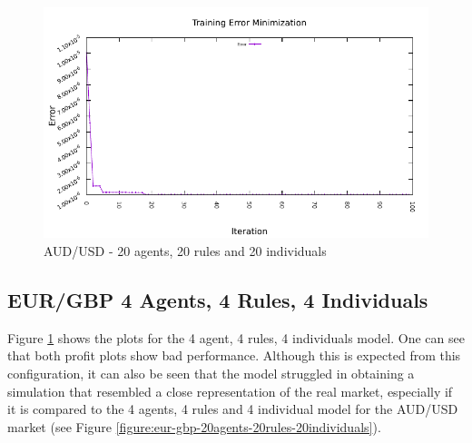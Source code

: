 \begin{figure}[htp]
  \medskip

  \includegraphics[width=.45\textwidth]{img/plots/aud_usd_h1-20agents-20rules-20ind-100gen_error_minimization.pdf}

  \caption{AUD/USD - 20 agents, 20 rules and 20 individuals}
  \label{figure:aud-usd-20agents-20rules-20individuals}
\end{figure}






\newpage

\subsection{EUR/GBP 4 Agents, 4 Rules, 4 Individuals}
\label{results:forecast-eur-gbp-4agents-4rules-4individuals}

Figure \ref{figure:aud-usd-20agents-20rules-20individuals} shows the plots for the 4 agent, 4 rules, 4 individuals model. One can see that both profit plots show bad performance. Although this is expected from this configuration, it can also be seen that the model struggled in obtaining a simulation that resembled a close representation of the real market, especially if it is compared to the 4 agents, 4 rules and 4 individual model for the AUD/USD market (see Figure \ref{figure:eur-gbp-20agents-20rules-20individuals}).

